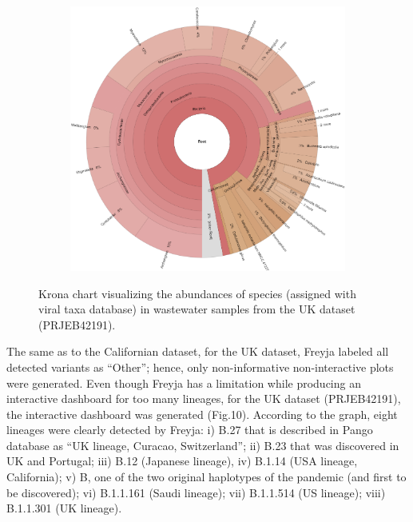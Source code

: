 \begin{figure}[H]
\begin{subfigure}[b]{0.3\textwidth}
        \label{fig:results:real:krona-uk-b}
        \end{subfigure}
        \hfill
        \begin{subfigure}[b]{0.3\textwidth}
        \includegraphics[width=1\textwidth]{figures/results/real/krona/krona-uk-all.png}
        \label{fig:results:real:krona-uk-c}
        \end{subfigure}
        \caption{Krona chart visualizing the abundances of species (assigned with viral taxa database) in wastewater samples from the UK dataset (PRJEB42191).}
    \end{figure}
    
    The same as to the Californian dataset, for the UK dataset, Freyja labeled all detected variants as “Other”; hence, only non-informative non-interactive plots were generated. Even though Freyja has a limitation while producing an interactive dashboard for too many lineages, for the UK dataset (PRJEB42191), the interactive dashboard was generated (Fig.10). According to the graph, eight lineages were clearly detected by Freyja: i) B.27 that is described in Pango database as “UK lineage, Curacao, Switzerland”; ii) B.23 that was discovered in UK and Portugal; iii) B.12 (Japanese lineage), iv) B.1.14 (USA lineage, California); v) B, one of the two original haplotypes of the pandemic (and first to be discovered); vi) B.1.1.161 (Saudi lineage); vii) B.1.1.514 (US lineage); viii) B.1.1.301 (UK lineage). 
    
